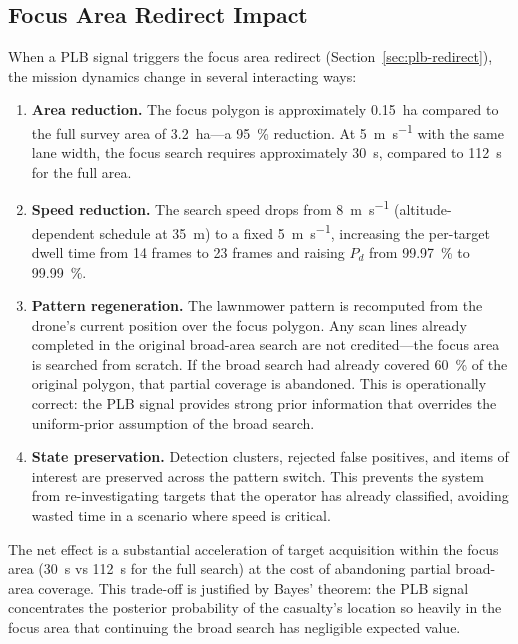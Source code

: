 \subsection{Focus Area Redirect Impact}\label{sec:focus-impact-old}

When a PLB signal triggers the focus area redirect (Section~\ref{sec:plb-redirect}), the mission dynamics change in several interacting ways:

\begin{enumerate}
  \item \textbf{Area reduction.} The focus polygon is approximately \SI{0.15}{\hectare} compared to the full survey area of \SI{3.2}{\hectare}---a \SI{95}{\percent} reduction. At \SI{5}{\metre\per\second} with the same lane width, the focus search requires approximately \SI{30}{\second}, compared to \SI{112}{\second} for the full area.

  \item \textbf{Speed reduction.} The search speed drops from \SI{8}{\metre\per\second} (altitude-dependent schedule at \SI{35}{\metre}) to a fixed \SI{5}{\metre\per\second}, increasing the per-target dwell time from 14 frames to 23 frames and raising $P_d$ from \SI{99.97}{\percent} to \SI{99.99}{\percent}.

  \item \textbf{Pattern regeneration.} The lawnmower pattern is recomputed from the drone's current position over the focus polygon. Any scan lines already completed in the original broad-area search are not credited---the focus area is searched from scratch. If the broad search had already covered \SI{60}{\percent} of the original polygon, that partial coverage is abandoned. This is operationally correct: the PLB signal provides strong prior information that overrides the uniform-prior assumption of the broad search.

  \item \textbf{State preservation.} Detection clusters, rejected false positives, and items of interest are preserved across the pattern switch. This prevents the system from re-investigating targets that the operator has already classified, avoiding wasted time in a scenario where speed is critical.
\end{enumerate}

The net effect is a substantial acceleration of target acquisition within the focus area (\SI{30}{\second} vs \SI{112}{\second} for the full search) at the cost of abandoning partial broad-area coverage. This trade-off is justified by Bayes' theorem: the PLB signal concentrates the posterior probability of the casualty's location so heavily in the focus area that continuing the broad search has negligible expected value.

